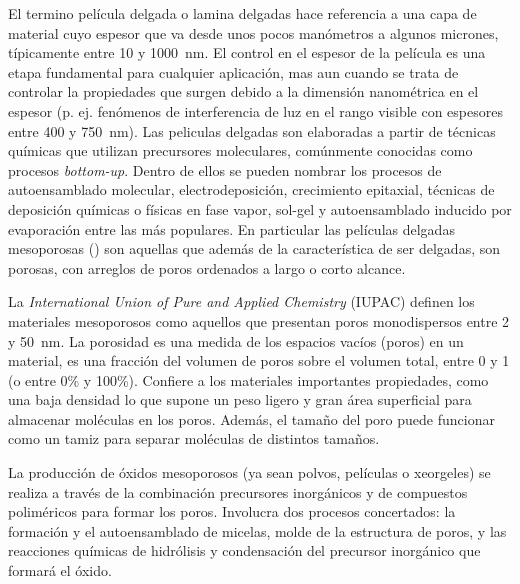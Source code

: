 	El termino película delgada o lamina delgadas hace referencia a una capa de material cuyo espesor que va desde unos pocos manómetros a algunos micrones, típicamente entre 10 y \SI{1000}{\nm}. El control en el espesor de la película es una etapa fundamental para cualquier aplicación, mas aun cuando se trata de controlar la propiedades que surgen debido a la dimensión nanométrica en el espesor (p. ej. fenómenos de interferencia de luz en el rango visible con espesores entre 400 y \SI{750}{\nm}). 
    Las peliculas delgadas son elaboradas a partir de técnicas químicas que utilizan precursores moleculares, comúnmente conocidas como procesos \textit{bottom-up}. Dentro de ellos se pueden nombrar los procesos de autoensamblado molecular, electrodeposición, crecimiento epitaxial, técnicas de deposición químicas o físicas en fase vapor, sol-gel y autoensamblado inducido por evaporación entre las más populares. En particular las películas delgadas mesoporosas (\pdm) son aquellas que además de la característica de ser delgadas, son porosas, con arreglos de poros ordenados a largo o corto alcance.

	La \textit{International Union of Pure and Applied Chemistry} (IUPAC) definen los materiales mesoporosos como aquellos que presentan poros monodispersos entre 2 y \SI{50}{\nm}. La porosidad es una medida de los espacios vacíos (poros) en un material, es una fracción del volumen de poros sobre el volumen total, entre 0 y 1 (o entre 0\% y 100\%).\cite{iupac-1994} Confiere a los materiales importantes propiedades, como una baja densidad lo que supone un peso ligero y gran área superficial para almacenar moléculas en los poros. Además, el tamaño del poro puede funcionar como un tamiz para separar moléculas de distintos tamaños.\cite{Martin2004} 

	La producción de óxidos mesoporosos (ya sean polvos, películas o xeorgeles) se realiza a través de la combinación precursores inorgánicos y de compuestos poliméricos para formar los poros. Involucra dos procesos concertados: la formación y el autoensamblado de micelas, molde de la estructura de poros, y las reacciones químicas de hidrólisis y condensación del precursor inorgánico que formará el óxido. 

